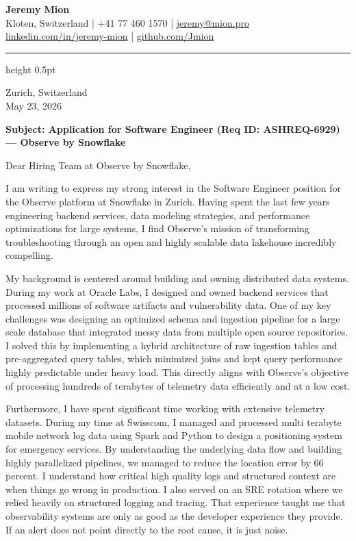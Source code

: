 \documentclass[11pt, a4paper]{article}
\newcommand{\linebar}{%
  \vspace{1pt}\hrule height 0.5pt\hfill\vspace{5pt}%
}
\begin{document}
\begin{center}
    {\LARGE \textbf{Jeremy Mion}} \\
    \vspace{5pt}
    \small
    Kloten, Switzerland | +41 77 460 1570 | \href{mailto:jeremy@mion.pro}{jeremy@mion.pro} \\
    \href{https://linkedin.com/in/jeremy-mion/}{linkedin.com/in/jeremy-mion} | \href{https://github.com/Jmion}{github.com/Jmion}
\end{center}
\linebar
\vspace{10pt}

\hfill Zurich, Switzerland \\
\hfill May 23, 2026 \\

\vspace{10pt}

\textbf{Subject: Application for Software Engineer (Req ID: ASHREQ-6929) --- Observe by Snowflake}

\vspace{10pt}

Dear Hiring Team at Observe by Snowflake,

I am writing to express my strong interest in the Software Engineer position for the Observe platform at Snowflake in Zurich. Having spent the last few years engineering backend services, data modeling strategies, and performance optimizations for large systems, I find Observe's mission of transforming troubleshooting through an open and highly scalable data lakehouse incredibly compelling.

My background is centered around building and owning distributed data systems. During my work at Oracle Labs, I designed and owned backend services that processed millions of software artifacts and vulnerability data. One of my key challenges was designing an optimized schema and ingestion pipeline for a large scale database that integrated messy data from multiple open source repositories. I solved this by implementing a hybrid architecture of raw ingestion tables and pre-aggregated query tables, which minimized joins and kept query performance highly predictable under heavy load. This directly aligns with Observe's objective of processing hundreds of terabytes of telemetry data efficiently and at a low cost.

Furthermore, I have spent significant time working with extensive telemetry datasets. During my time at Swisscom, I managed and processed multi terabyte mobile network log data using Spark and Python to design a positioning system for emergency services. By understanding the underlying data flow and building highly parallelized pipelines, we managed to reduce the location error by 66 percent. I understand how critical high quality logs and structured context are when things go wrong in production. I also served on an SRE rotation where we relied heavily on structured logging and tracing. That experience taught me that observability systems are only as good as the developer experience they provide. If an alert does not point directly to the root cause, it is just noise.
\end{document}
